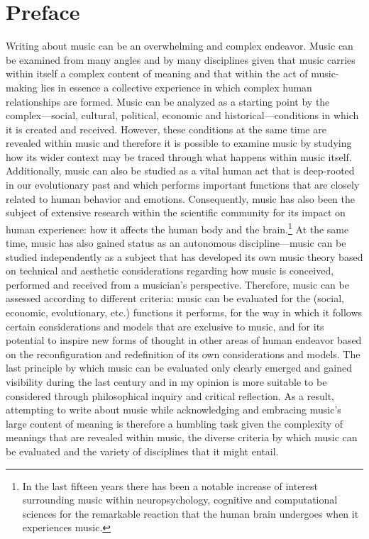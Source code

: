 \chapter{Preface}


Writing about music can be an overwhelming and complex endeavor. Music can be examined from many angles and by many disciplines given that music carries within itself a complex content of meaning and that within the act of music-making lies in essence a collective experience in which complex human relationships are formed. Music can be analyzed as a starting point by the complex---social, cultural, political, economic and historical---conditions in which it is created and received. However, these conditions at the same time are revealed within music and therefore it is possible to examine music by studying how its wider context may be traced through what happens within music itself. Additionally, music can also be studied as a vital human act that is deep-rooted in our evolutionary past and which performs important functions that are closely related to human behavior and emotions. Consequently, music has also been the subject of extensive research within the scientific community for its impact on human experience: how it affects the human body and the brain.\footnote{In the last fifteen years there has been a notable increase of interest surrounding music within neuropsychology, cognitive and computational sciences for the remarkable reaction that the human brain undergoes when it experiences music.} At the same time, music has also gained status as an autonomous discipline---music can be studied independently as a subject that has developed its own music theory based on technical and aesthetic considerations regarding how music is conceived, performed and received from a musician's perspective. Therefore, music can be assessed according to different criteria: music can be evaluated for the (social, economic, evolutionary, etc.) functions it performs, for the way in which it follows certain considerations and models that are exclusive to music, and for its potential to inspire new forms of thought in other areas of human endeavor based on the reconfiguration and redefinition of its own considerations and models. The last principle by which music can be evaluated only clearly emerged and gained visibility during the last century and in my opinion is more suitable to be considered through philosophical inquiry and critical reflection. As a result, attempting to write about music while acknowledging and embracing music's large content of meaning is therefore a humbling task given the complexity of meanings that are revealed within music, the diverse criteria by which music can be evaluated and the variety of disciplines that it might entail.

